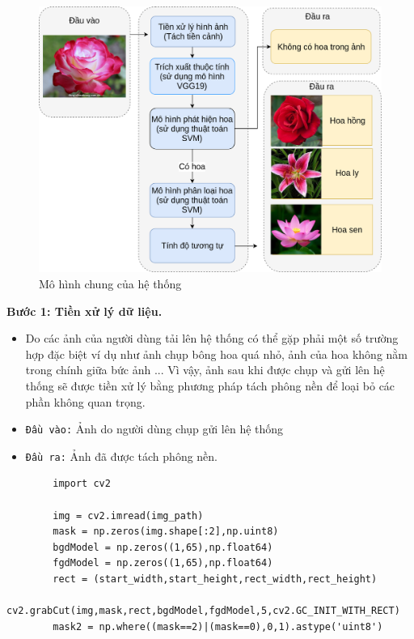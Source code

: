 \documentclass[12pt]{report}
\begin{document}
		\begin{figure}[h]
			\centering
			\includegraphics[scale=0.3]{mohinhchung2}
			\caption{Mô hình chung của hệ thống}
			\label{fig:mohinhchung}
		\end{figure}
														
		\textbf{Bước 1: Tiền xử lý dữ liệu.} 
		\begin{itemize}
			\item Do các ảnh của người dùng tải lên hệ thống có thể gặp phải một số trường hợp đặc biệt ví dụ như ảnh chụp bông hoa quá nhỏ, ảnh của hoa không nằm trong chính giữa bức ảnh ... Vì vậy, ảnh sau khi được chụp và gửi lên hệ thống sẽ được tiền xử lý bằng phương pháp tách phông nền để loại bỏ các phần không quan trọng.
			\item \texttt{Đầu vào:} Ảnh do người dùng chụp gửi lên hệ thống
			\item \texttt{Đầu ra:} Ảnh đã được tách phông nền.
		\end{itemize}
		
		
\begin{lstlisting}
		import cv2
		
        img = cv2.imread(img_path)
        mask = np.zeros(img.shape[:2],np.uint8)
        bgdModel = np.zeros((1,65),np.float64)
        fgdModel = np.zeros((1,65),np.float64)
        rect = (start_width,start_height,rect_width,rect_height)
        cv2.grabCut(img,mask,rect,bgdModel,fgdModel,5,cv2.GC_INIT_WITH_RECT)
        mask2 = np.where((mask==2)|(mask==0),0,1).astype('uint8')
		\end{lstlisting}
														
\end{document}
